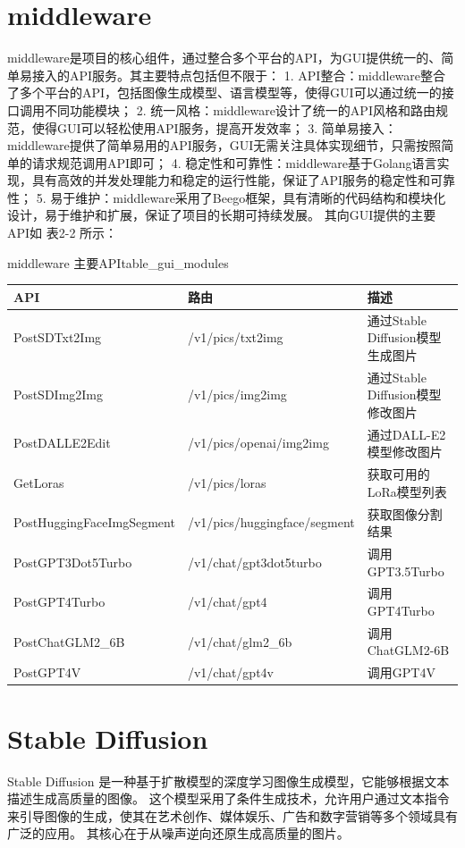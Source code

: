 \documentclass[a4paper,AutoFakeBold,oneside,12pt]{book}
\begin{document}
\section{middleware}
middleware是项目的核心组件，通过整合多个平台的API，为GUI提供统一的、简单易接入的API服务。其主要特点包括但不限于：
1. API整合：middleware整合了多个平台的API，包括图像生成模型、语言模型等，使得GUI可以通过统一的接口调用不同功能模块；
2. 统一风格：middleware设计了统一的API风格和路由规范，使得GUI可以轻松使用API服务，提高开发效率；
3. 简单易接入：middleware提供了简单易用的API服务，GUI无需关注具体实现细节，只需按照简单的请求规范调用API即可；
4. 稳定性和可靠性：middleware基于Golang语言实现，具有高效的并发处理能力和稳定的运行性能，保证了API服务的稳定性和可靠性；
5. 易于维护：middleware采用了Beego框架，具有清晰的代码结构和模块化设计，易于维护和扩展，保证了项目的长期可持续发展。
其向GUI提供的主要API如 表2-2 所示：
\begin{bupttable}{middleware 主要API}{table_gui_modules}
    \begin{tabular}{|l|l|l|}
        \hline \textbf{API} & \textbf{路由} & \textbf{描述} \\
        \hline PostSDTxt2Img & /v1/pics/txt2img & 通过Stable Diffusion模型生成图片  \\
        \hline PostSDImg2Img & /v1/pics/img2img & 通过Stable Diffusion模型修改图片 \\
        \hline PostDALLE2Edit & /v1/pics/openai/img2img & 通过DALL-E2模型修改图片  \\
		\hline GetLoras & /v1/pics/loras & 获取可用的LoRa模型列表  \\
		\hline PostHuggingFaceImgSegment & /v1/pics/huggingface/segment & 获取图像分割结果  \\
		\hline PostGPT3Dot5Turbo & /v1/chat/gpt3dot5turbo & 调用GPT3.5Turbo  \\
		\hline PostGPT4Turbo & /v1/chat/gpt4 & 调用GPT4Turbo  \\
		\hline PostChatGLM2\_6B & /v1/chat/glm2\_6b & 调用ChatGLM2-6B  \\
		\hline PostGPT4V & /v1/chat/gpt4v & 调用GPT4V  \\
        \hline
    \end{tabular}
\end{bupttable}

\section{Stable Diffusion}
Stable Diffusion 是一种基于扩散模型的深度学习图像生成模型，它能够根据文本描述生成高质量的图像。
这个模型采用了条件生成技术，允许用户通过文本指令来引导图像的生成，使其在艺术创作、媒体娱乐、广告和数字营销等多个领域具有广泛的应用。
其核心在于从噪声逆向还原生成高质量的图片。
\end{document}
